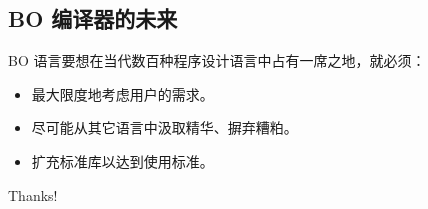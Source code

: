 \documentclass[dvipsnames, svgnames, x11names]{beamer}
\begin{document}
\subsection{BO 编译器的未来}
\begin{frame}
    \onslide<+->BO 语言要想在当代数百种程序设计语言中占有一席之地，就必须：

    \begin{itemize}[<+->]
        \item 最大限度地考虑用户的需求。
        \item 尽可能从其它语言中汲取精华、摒弃糟粕。
        \item 扩充标准库以达到使用标准。
    \end{itemize}
\end{frame}

\begin{frame}[plain]
    \begin{center}
        {\Huge Thanks!}
    \end{center}
\end{frame}
\end{document}
